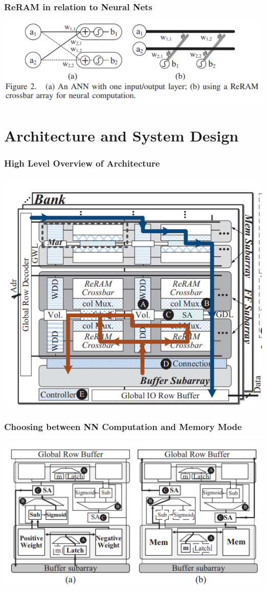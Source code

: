 \documentclass[hyperref={colorlinks}]{beamer}
\begin{document}
\begin{frame}
	\frametitle{ReRAM in relation to Neural Nets}
	\includegraphics[scale=0.5]{reram_nn.png}
\end{frame}

\section{Architecture and System Design}
\begin{frame}
	\frametitle{High Level Overview of Architecture}
	\includegraphics[scale=0.4, center]{prime_arch.png}
\end{frame}

\begin{frame}
	\frametitle{Choosing between NN Computation and Memory Mode}
	\includegraphics[scale=0.4, center]{NNvsMem.png}
\end{frame}
\end{document}
